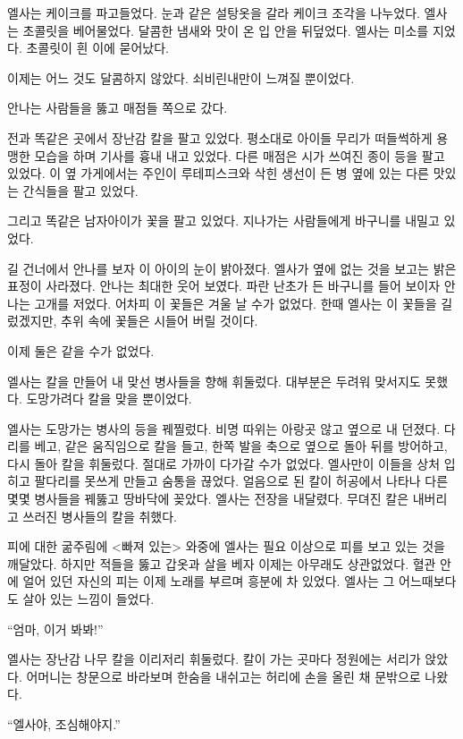 엘사는 케이크를 파고들었다. 눈과 같은 설탕옷을 갈라 케이크 조각을 나누었다. 엘사는 초콜릿을 베어물었다. 달콤한 냄새와 맛이 온 입 안을 뒤덮었다. 엘사는 미소를 지었다. 초콜릿이 흰 이에 묻어났다.

이제는 어느 것도 달콤하지 않았다. 쇠비린내만이 느껴질 뿐이었다.

\textbreak

안나는 사람들을 뚫고 매점들 쪽으로 갔다.

전과 똑같은 곳에서 장난감 칼을 팔고 있었다. 평소대로 아이들 무리가 떠들썩하게 용맹한 모습을 하며 기사를 흉내 내고 있었다. 다른 매점은 시가 쓰여진 종이 등을 팔고 있었다. 이 옆 가게에서는 주인이 루테피스크와 삭힌 생선이 든 병 옆에 있는 다른 맛있는 간식들을 팔고 있었다.

그리고 똑같은 남자아이가 꽃을 팔고 있었다. 지나가는 사람들에게 바구니를 내밀고 있었다.

길 건너에서 안나를 보자 이 아이의 눈이 밝아졌다. 엘사가 옆에 없는 것을 보고는 밝은 표정이 사라졌다. 안나는 최대한 웃어 보였다. 파란 난초가 든 바구니를 들어 보이자 안나는 고개를 저었다. 어차피 이 꽃들은 겨울 날 수가 없었다. 한때 엘사는 이 꽃들을 길렀겠지만, 추위 속에 꽃들은 시들어 버릴 것이다.

이제 둘은 같을 수가 없었다.

\textbreak

엘사는 칼을 만들어 내 맞선 병사들을 향해 휘둘렀다. 대부분은 두려워 맞서지도 못했다. 도망가려다 칼을 맞을 뿐이었다.

엘사는 도망가는 병사의 등을 꿰찔렀다. 비명 따위는 아랑곳 않고 옆으로 내 던졌다. 다리를 베고, 같은 움직임으로 칼을 들고, 한쪽 발을 축으로 옆으로 돌아 뒤를 방어하고, 다시 돌아 칼을 휘둘렀다. 절대로 가까이 다가갈 수가 없었다. 엘사만이 이들을 상처 입히고 팔다리를 못쓰게 만들고 숨통을 끊었다. 얼음으로 된 칼이 허공에서 나타나 다른 몇몇 병사들을 꿰뚫고 땅바닥에 꽂았다. 엘사는 전장을 내달렸다. 무뎌진 칼은 내버리고 쓰러진 병사들의 칼을 취했다.

피에 대한 굶주림에 <빠져 있는> 와중에 엘사는 필요 이상으로 피를 보고 있는 것을 깨달았다. 하지만 적들을 뚫고 갑옷과 살을 베자 이제는 아무래도 상관없었다. 혈관 안에 얼어 있던 자신의 피는 이제 노래를 부르며 흥분에 차 있었다. 엘사는 그 어느때보다도 살아 있는 느낌이 들었다.

``엄마, 이거 봐봐!''

엘사는 장난감 나무 칼을 이리저리 휘둘렀다. 칼이 가는 곳마다 정원에는 서리가 앉았다. 어머니는 창문으로 바라보며 한숨을 내쉬고는 허리에 손을 올린 채 문밖으로 나왔다.

``엘사야, 조심해야지.''

